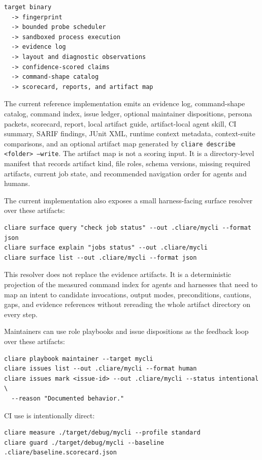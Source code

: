 \documentclass[11pt]{article}
\begin{document}
\begin{verbatim}
target binary
  -> fingerprint
  -> bounded probe scheduler
  -> sandboxed process execution
  -> evidence log
  -> layout and diagnostic observations
  -> confidence-scored claims
  -> command-shape catalog
  -> scorecard, reports, and artifact map
\end{verbatim}

The current reference implementation emits an evidence log, command-shape catalog, command index, issue ledger, optional maintainer dispositions, persona packets, scorecard, report, local artifact guide, artifact-local agent skill, CI summary, SARIF findings, JUnit XML, runtime context metadata, context-suite comparisons, and an optional artifact map generated by \texttt{cliare describe <folder> --write}. The artifact map is not a scoring input. It is a directory-level manifest that records artifact kind, file roles, schema versions, missing required artifacts, current job state, and recommended navigation order for agents and humans.

The current implementation also exposes a small harness-facing surface resolver over these artifacts:

\begin{verbatim}
cliare surface query "check job status" --out .cliare/mycli --format json
cliare surface explain "jobs status" --out .cliare/mycli
cliare surface list --out .cliare/mycli --format json
\end{verbatim}

This resolver does not replace the evidence artifacts. It is a deterministic projection of the measured command index for agents and harnesses that need to map an intent to candidate invocations, output modes, preconditions, cautions, gaps, and evidence references without rereading the whole artifact directory on every step.

Maintainers can use role playbooks and issue dispositions as the feedback loop over these artifacts:

\begin{verbatim}
cliare playbook maintainer --target mycli
cliare issues list --out .cliare/mycli --format human
cliare issues mark <issue-id> --out .cliare/mycli --status intentional \
  --reason "Documented behavior."
\end{verbatim}

CI use is intentionally direct:

\begin{verbatim}
cliare measure ./target/debug/mycli --profile standard
cliare guard ./target/debug/mycli --baseline .cliare/baseline.scorecard.json
\end{verbatim}
\end{document}
